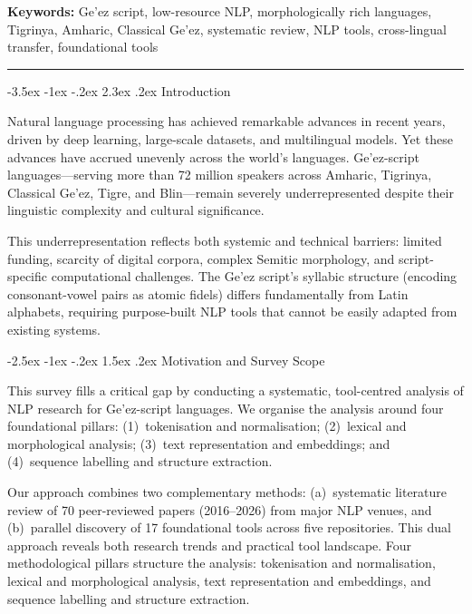 \documentclass[12pt,a4paper]{article}
\makeatletter
\theoremstyle{plain}
\theoremstyle{definition}
\renewcommand{\section}{\@startsection{section}{1}{\z@}%
  {-3.5ex \@plus -1ex \@minus -.2ex}%
  {2.3ex \@plus.2ex}%
  {\large\bfseries\color{NavyBlue}}}
\renewcommand{\subsection}{\@startsection{subsection}{2}{\z@}%
  {-2.5ex \@plus -1ex \@minus -.2ex}%
  {1.5ex \@plus .2ex}%
  {\normalsize\bfseries\color{DarkGray}}}
\makeatother
\begin{document}
\noindent\textbf{Keywords:} Ge'ez script, low-resource NLP, morphologically rich languages, Tigrinya, Amharic, Classical Ge'ez, systematic review, NLP tools, cross-lingual transfer, foundational tools

\vspace{12pt}
\hrule
\vspace{12pt}


\section{Introduction}

Natural language processing has achieved remarkable advances in recent years, driven by deep learning, large-scale datasets, and multilingual models. Yet these advances have accrued unevenly across the world's languages. Ge'ez-script languages---serving more than 72 million speakers across Amharic, Tigrinya, Classical Ge'ez, Tigre, and Blin---remain severely underrepresented despite their linguistic complexity and cultural significance.

This underrepresentation reflects both systemic and technical barriers: limited funding, scarcity of digital corpora, complex Semitic morphology, and script-specific computational challenges. The Ge'ez script's syllabic structure (encoding consonant-vowel pairs as atomic fidels) differs fundamentally from Latin alphabets, requiring purpose-built NLP tools that cannot be easily adapted from existing systems.

\subsection{Motivation and Survey Scope}

This survey fills a critical gap by conducting a systematic, tool-centred analysis of NLP research for Ge'ez-script languages. We organise the analysis around four foundational pillars: (1)~tokenisation and normalisation; (2)~lexical and morphological analysis; (3)~text representation and embeddings; and (4)~sequence labelling and structure extraction.

Our approach combines two complementary methods: (a)~systematic literature review of 70 peer-reviewed papers (2016--2026) from major NLP venues, and (b)~parallel discovery of 17 foundational tools across five repositories. This dual approach reveals both research trends and practical tool landscape. Four methodological pillars structure the analysis: tokenisation and normalisation, lexical and morphological analysis, text representation and embeddings, and sequence labelling and structure extraction.
\end{document}
